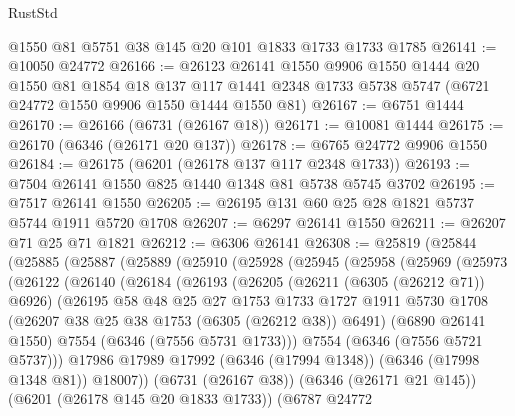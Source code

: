 \begin{lexlean}{RustStd}
\begin{coremodule}
    @1550
    @81
    @5751
    @38
    @145
    @20
    @101
    @1833
    @1733
    @1733
    @1785
@26141 := @10050 @24772
@26166 := @26123
    @26141
    @1550
    @9906
    @1550
    @1444
    @20
    @1550
    @81
    @1854
    @18
    @137
    @117
    @1441
    @2348
    @1733
    @5738
    @5747
    (@6721 @24772 @1550 @9906 @1550 @1444 @1550 @81)
@26167 := @6751 @1444
@26170 := @26166 (@6731 (@26167 @18))
@26171 := @10081 @1444
@26175 := @26170 (@6346 (@26171 @20 @137))
@26178 := @6765 @24772 @9906 @1550
@26184 := @26175 (@6201 (@26178 @137 @117 @2348 @1733))
@26193 := @7504 @26141 @1550 @825 @1440 @1348 @81 @5738 @5745 @3702
@26195 := @7517 @26141 @1550
@26205 := @26195 @131 @60 @25 @28 @1821 @5737 @5744 @1911 @5720 @1708
@26207 := @6297 @26141 @1550
@26211 := @26207 @71 @25 @71 @1821
@26212 := @6306 @26141
@26308 := @25819
    (@25844
      (@25885
        (@25887
          (@25889
            (@25910
              (@25928
                (@25945
                  (@25958
                    (@25969
                      (@25973
                        (@26122
                          (@26140
                            (@26184
                              (@26193
                                (@26205
                                  (@26211 (@6305 (@26212 @71)) @6926)
                                  (@26195
                                    @58
                                    @48
                                    @25
                                    @27
                                    @1753
                                    @1733
                                    @1727
                                    @1911
                                    @5730
                                    @1708
                                    (@26207 @38 @25 @38 @1753 (@6305 (@26212 @38)) @6491)
                                    (@6890 @26141 @1550)
                                    @7554
                                    (@6346 (@7556 @5731 @1733)))
                                  @7554
                                  (@6346 (@7556 @5721 @5737)))
                                @17986
                                @17989
                                @17992
                                (@6346 (@17994 @1348))
                                (@6346 (@17998 @1348 @81))
                                @18007))
                            (@6731 (@26167 @38))
                            (@6346 (@26171 @21 @145))
                            (@6201 (@26178 @145 @20 @1833 @1733))
                            (@6787
                              @24772

\end{coremodule}
\end{lexlean}

